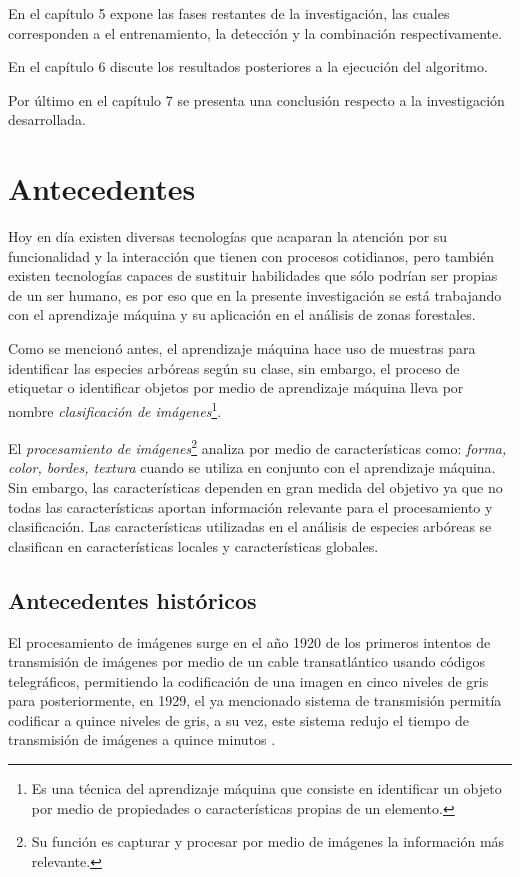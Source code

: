 En el capítulo 5 expone las fases restantes de la investigación, las cuales corresponden a el entrenamiento, la detección y la combinación respectivamente.

En el capítulo 6 discute los resultados posteriores a la ejecución del algoritmo.

Por último en el capítulo 7 se presenta una conclusión respecto a la investigación desarrollada.

\chapter{Antecedentes}
Hoy en día existen diversas tecnologías que acaparan la atención por su funcionalidad y la interacción que tienen con procesos cotidianos, pero también existen tecnologías capaces de sustituir habilidades que sólo podrían ser propias de un ser humano, es por eso que en la presente investigación se está trabajando con el aprendizaje máquina y su aplicación en el análisis de zonas forestales.

Como se mencionó antes, el aprendizaje máquina hace uso de muestras para identificar las especies arbóreas según su clase, sin embargo, el proceso de etiquetar o identificar objetos por medio de aprendizaje máquina lleva por nombre \emph{clasificación de imágenes}\footnote{Es una técnica del aprendizaje máquina que consiste en identificar un objeto por medio de propiedades o características propias de un elemento.}.

El \emph{procesamiento de imágenes}\footnote{Su función es capturar y procesar por medio de imágenes la información más relevante.} analiza por medio de características como: \emph{forma, color, bordes, textura} cuando se utiliza en conjunto con el aprendizaje máquina. Sin embargo, las características dependen en gran medida del objetivo ya que no todas las características aportan información relevante para el procesamiento y clasificación. Las características utilizadas en el análisis de especies arbóreas se clasifican en características locales y características globales.

\section{Antecedentes históricos}
El procesamiento de imágenes surge en el año 1920 de los primeros intentos de transmisión de imágenes por medio de un cable transatlántico usando códigos telegráficos, permitiendo la codificación de una imagen en cinco niveles de gris para posteriormente, en 1929, el ya mencionado sistema de transmisión permitía codificar a quince niveles de gris, a su vez, este sistema redujo el tiempo de transmisión de imágenes a quince minutos \citep{rf4}. 

